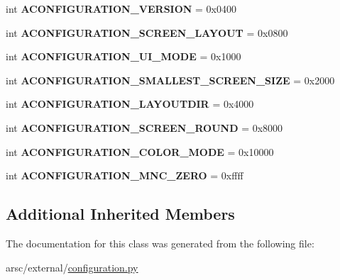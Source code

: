 \begin{DoxyCompactItemize}
int {\bfseries A\+C\+O\+N\+F\+I\+G\+U\+R\+A\+T\+I\+O\+N\+\_\+\+V\+E\+R\+S\+I\+ON} = 0x0400
\item 
\mbox{\label{classarsc_1_1external_1_1configuration_1_1AConfiguration_adb2282dc170511fced1d30c184574a0c}} 
int {\bfseries A\+C\+O\+N\+F\+I\+G\+U\+R\+A\+T\+I\+O\+N\+\_\+\+S\+C\+R\+E\+E\+N\+\_\+\+L\+A\+Y\+O\+UT} = 0x0800
\item 
\mbox{\label{classarsc_1_1external_1_1configuration_1_1AConfiguration_a3fba47fe7262715a737d2c39f85fa5f5}} 
int {\bfseries A\+C\+O\+N\+F\+I\+G\+U\+R\+A\+T\+I\+O\+N\+\_\+\+U\+I\+\_\+\+M\+O\+DE} = 0x1000
\item 
\mbox{\label{classarsc_1_1external_1_1configuration_1_1AConfiguration_a1cf5edf4bbd1550329f55fa6306787a7}} 
int {\bfseries A\+C\+O\+N\+F\+I\+G\+U\+R\+A\+T\+I\+O\+N\+\_\+\+S\+M\+A\+L\+L\+E\+S\+T\+\_\+\+S\+C\+R\+E\+E\+N\+\_\+\+S\+I\+ZE} = 0x2000
\item 
\mbox{\label{classarsc_1_1external_1_1configuration_1_1AConfiguration_aaaabadd26c5ce00b9594ddfa451499c2}} 
int {\bfseries A\+C\+O\+N\+F\+I\+G\+U\+R\+A\+T\+I\+O\+N\+\_\+\+L\+A\+Y\+O\+U\+T\+D\+IR} = 0x4000
\item 
\mbox{\label{classarsc_1_1external_1_1configuration_1_1AConfiguration_a3d9fdb4ff9f6e46eb07732ea108accf3}} 
int {\bfseries A\+C\+O\+N\+F\+I\+G\+U\+R\+A\+T\+I\+O\+N\+\_\+\+S\+C\+R\+E\+E\+N\+\_\+\+R\+O\+U\+ND} = 0x8000
\item 
\mbox{\label{classarsc_1_1external_1_1configuration_1_1AConfiguration_ac36d76a5570798eb212277588a064c0e}} 
int {\bfseries A\+C\+O\+N\+F\+I\+G\+U\+R\+A\+T\+I\+O\+N\+\_\+\+C\+O\+L\+O\+R\+\_\+\+M\+O\+DE} = 0x10000
\item 
\mbox{\label{classarsc_1_1external_1_1configuration_1_1AConfiguration_abfb660865d88d4b4860cdd08566c329e}} 
int {\bfseries A\+C\+O\+N\+F\+I\+G\+U\+R\+A\+T\+I\+O\+N\+\_\+\+M\+N\+C\+\_\+\+Z\+E\+RO} = 0xffff
\end{DoxyCompactItemize}
\subsection*{Additional Inherited Members}


The documentation for this class was generated from the following file\+:\begin{DoxyCompactItemize}
\item 
arsc/external/\mbox{\hyperlink{configuration_8py}{configuration.\+py}}\end{DoxyCompactItemize}
